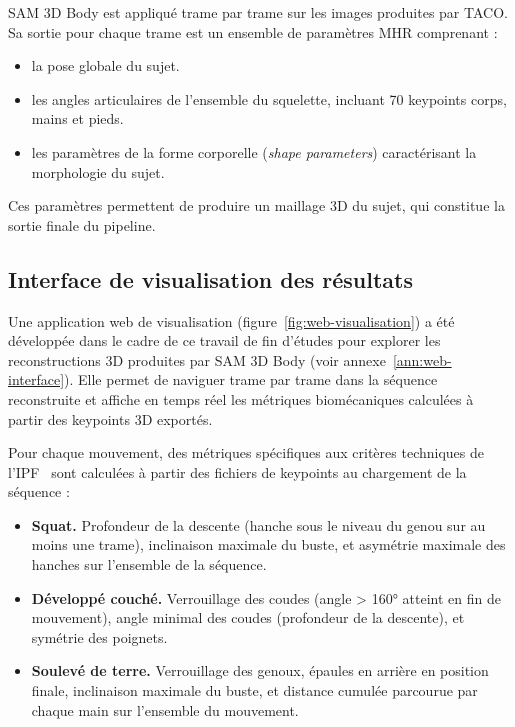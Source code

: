 SAM 3D Body est appliqué trame par trame sur les images produites par TACO. Sa sortie pour chaque trame est un ensemble de paramètres MHR comprenant :
\begin{itemize}
  \item la pose globale du sujet.
  \item les angles articulaires de l'ensemble du squelette, incluant 70 keypoints corps, mains et pieds.
  \item les paramètres de la forme corporelle (\emph{shape parameters}) caractérisant la morphologie du sujet.
\end{itemize}

Ces paramètres permettent de produire un maillage 3D du sujet, qui constitue la sortie finale du pipeline.

\subsection*{Interface de visualisation des résultats}

Une application web de visualisation (figure~\ref{fig:web-visualisation}) a été développée dans le cadre de ce travail de fin d'études pour explorer les reconstructions 3D produites par SAM 3D Body (voir annexe~\ref{ann:web-interface}). Elle permet de naviguer trame par trame dans la séquence reconstruite et affiche en temps réel les métriques biomécaniques calculées à partir des keypoints 3D exportés.

Pour chaque mouvement, des métriques spécifiques aux critères techniques de l'IPF~\cite{IPF-Technical-Regulations-2025} sont calculées à partir des fichiers de keypoints au chargement de la séquence :

\begin{itemize}
  \item \textbf{Squat.} Profondeur de la descente (hanche sous le niveau du genou sur au moins une trame), inclinaison maximale du buste, et asymétrie maximale des hanches sur l'ensemble de la séquence.
  \item \textbf{Développé couché.} Verrouillage des coudes (angle > 160° atteint en fin de mouvement), angle minimal des coudes (profondeur de la descente), et symétrie des poignets.
  \item \textbf{Soulevé de terre.} Verrouillage des genoux, épaules en arrière en position finale, inclinaison maximale du buste, et distance cumulée parcourue par chaque main sur l'ensemble du mouvement.
\end{itemize}

